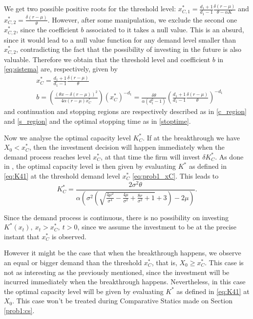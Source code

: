 We get two possible positive roots for the threshold level: $x^*_{C,1}=\frac{d_1+1}{d_1-1} \frac{ \delta (r-\mu)}{\theta-\alpha K}$ and $x^*_{C,2}=\frac{\delta  (r-\mu )}{\theta }$. However, after some manipulation, we exclude the second one $x^*_{C,2}$, since the coefficient $b$ associated to it takes a null value. This is an absurd, since it would lead to a null value function for any demand level smaller than $x^*_{C,2}$, contradicting the fact that the possibility of investing in the future is also valuable. Therefore we obtain that the threshold level and coefficient $b$ in \eqref{eq:sistema} are, respectively, given by
\begin{align}
 &x_C^*=\frac{d_1+1}{d_1-1} \frac{ \delta (r-\mu)}{\theta} \label{eq:prob1_xC}\\
 &b=\left( \frac{(\theta x -\delta (r-\mu))^2}{4 \alpha (r-\mu) x_C^*} \right)(x_C^*)^{-d_1} = \frac{\delta \theta}{\alpha (d_1^2-1)} \left( \frac{d_1+1}{d_1-1} \frac{ \delta (r-\mu)}{\theta} \right)^{-d_1} \nonumber
\end{align}
and continuation and stopping regions are respectively described as in \eqref{c_region} and \eqref{s_region} and the optimal stopping time as in \eqref{stoptime}.

Now we analyse the optimal capacity level $K^*_C$. If at the breakthrough we have $X_0<x^*_C$, then the investment decision will happen immediately when the demand process reaches level $x^*_C$, at that time the firm will invest $\delta K^*_C$. 
As done in \cite{huis:cap}, the optimal capacity level is then given by evaluating $K^*$ as defined in \eqref{eq:K41} at the threshold demand level $x^*_C$ \eqref{eq:prob1_xC}. This leads to
\begin{equation}
K^*_C=\frac{2 \sigma ^2 \theta}{\alpha \left(\sigma ^2 \left(\sqrt{\frac{4 \mu ^2}{\sigma ^4}-\frac{4 \mu }{\sigma ^2}+\frac{8 r}{\sigma ^2}+1}+3\right)-2 \mu \right)}.
\label{prob1:K*}
\end{equation}

Since the demand process is continuous, there is no possibility on investing $K^*(x_t), \ x_t>x_C^*, \ t>0$, since we assume the investment to be at the precise instant that $x^*_C$ is observed.

However it might be the case that when the breakthrough happens, we observe an equal or bigger demand than the threshold $x^*_C$, that is, $X_0\geq x^*_C$. This case is not as interesting as the previously mentioned, since the investment will be incurred immediately when the breakthrough happens. Nevertheless, in this case the optimal capacity level will be given by evaluating $K^*$ as defined in \eqref{eq:K41} at $X_0$. This case won't be treated during Comparative Statics made on Section \ref{prob1:cs}.



